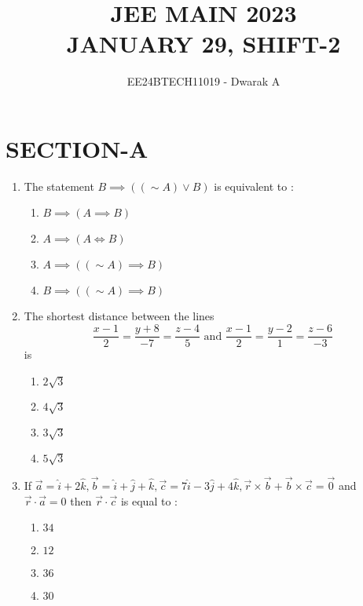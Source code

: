 \documentclass[journal,12pt,twocolumn]{IEEEtran}
\theoremstyle{remark}
\begin{document}

\vspace{3cm}

\title{\textbf{JEE MAIN 2023\\JANUARY 29, SHIFT-2}}
\author{EE24BTECH11019 - Dwarak A}
\maketitle
\newpage
\bigskip

\renewcommand{\thefigure}{\theenumi}
\renewcommand{\thetable}{\theenumi}

\section*{\textbf{SECTION-A}}
\bigskip

\begin{enumerate}
    \item The statement $B\implies((\sim A)\lor B)$ is equivalent to : 
        \begin{enumerate}
            \item $B\implies(A \implies B)$
            \item $A \implies(A \iff B)$
            \item $A \implies((\sim A)\implies B)$
            \item $B \implies((\sim A)\implies B)$
        \end{enumerate}
    
    \item The shortest distance between the lines $$\frac{x-1}{2}=\frac{y+8}{-7}=\frac{z-4}{5} \text{ and } \frac{x-1}{2}=\frac{y-2}{1}=\frac{z-6}{-3}$$ is
        \begin{enumerate}
            \item $2\sqrt{3}$
            \item $4\sqrt{3}$
            \item $3\sqrt{3}$
            \item $5\sqrt{3}$
        \end{enumerate}
    
    \item If $\vec{a}=\hat{i}+2\hat{k},\vec{b}=\hat{i}+\hat{j}+\hat{k},\vec{c}=7\hat{i}-3\hat{j}+4\hat{k},\vec{r}\times\vec{b}+\vec{b}\times\vec{c}=\vec{0}$ and $\vec{r}\cdot\vec{a}=0$ then $\vec{r}\cdot\vec{c}$ is equal to :
        \begin{enumerate}
            \item $34$
            \item $12$
            \item $36$
            \item $30$
        \end{enumerate}


\end{enumerate}
\end{document}
